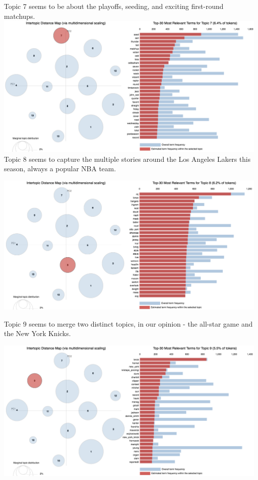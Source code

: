 \documentclass[11pt]{article}
\begin{document}
Topic 7 seems to be about the playoffs, seeding, and exciting first-round matchups.  \\
\includegraphics[width=470pt]{7.png} \\

Topic 8 seems to capture the multiple stories around the Los Angeles Lakers this season, always a popular NBA team. 

\includegraphics[width=470pt]{8.png} 

Topic 9 seems to merge two distinct topics, in our opinion - the all-star game and the New York Knicks. 

\includegraphics[width=470pt]{9.png} 
\end{document}
